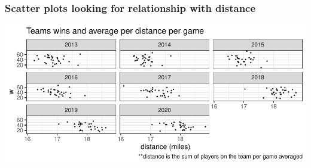 \documentclass[
]{article}
\begin{document}
\hypertarget{scatter-plots-looking-for-relationship-with-distance}{%
\subsubsection{Scatter plots looking for relationship with
distance}\label{scatter-plots-looking-for-relationship-with-distance}}

\includegraphics{EDA_files/figure-latex/unnamed-chunk-6-1.pdf}
\end{document}
